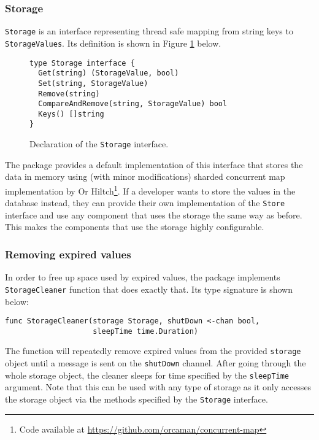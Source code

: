 \subsubsection{Storage}
\texttt{Storage} is an interface representing thread safe mapping from string keys
to \texttt{StorageValues}. Its definition is shown in Figure \ref{fig:Storage} below.
\begin{figure}[h]
\centering
\begin{lstlisting}
type Storage interface {
  Get(string) (StorageValue, bool)
  Set(string, StorageValue)
  Remove(string)
  CompareAndRemove(string, StorageValue) bool
  Keys() []string
}
\end{lstlisting}
\caption[scale=1.0]{Declaration of the \texttt{Storage} interface.}
\label{fig:Storage}
\end{figure}
The package provides a default implementation of this interface that
stores the data in memory using (with minor modifications) sharded concurrent map implementation
by Or Hiltch\footnote{Code available at \url{https://github.com/orcaman/concurrent-map}}.
If a developer wants to store the values in the 
database instead, they can provide their own implementation of the 
\texttt{Store} interface
and use any component that uses the storage the same way as before.
This makes the components that use the storage highly configurable.

\subsubsection{Removing expired values}
In order to free up space used by expired values, the package implements
\texttt{StorageCleaner} function that does exactly that. Its type signature
is shown below:
\begin{lstlisting}
func StorageCleaner(storage Storage, shutDown <-chan bool, 
                    sleepTime time.Duration)
\end{lstlisting}
The function will repeatedly remove expired values from the provided
\texttt{storage} object until a message is sent on the \texttt{shutDown}
channel. After going through the whole storage object, the cleaner 
sleeps for time specified by the \texttt{sleepTime} argument.
Note that this can be used with any type of storage as it only accesses
the storage object via the methods specified by the \texttt{Storage} 
interface.

